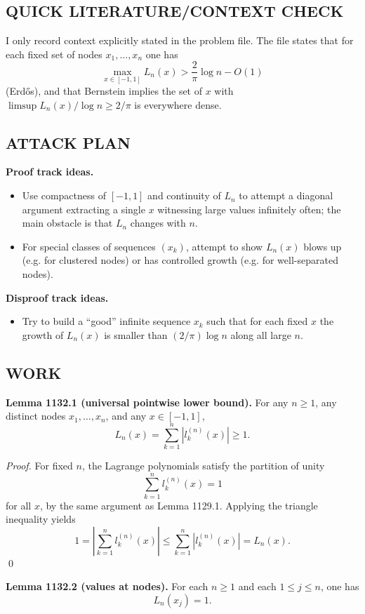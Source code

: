 \subsection*{QUICK LITERATURE/CONTEXT CHECK}
I only record context explicitly stated in the problem file.
The file states that for each fixed set of nodes $x_1,\dots,x_n$ one has
\[
\max_{x\in[-1,1]} L_n(x) > \frac{2}{\pi}\log n - O(1)
\]
(Erd\H{o}s), and that Bernstein implies the set of $x$ with $\limsup L_n(x)/\log n\ge 2/\pi$ is everywhere dense.

\subsection*{ATTACK PLAN}
\textbf{Proof track ideas.}
\begin{itemize}
\item Use compactness of $[-1,1]$ and continuity of $L_n$ to attempt a diagonal argument extracting a single $x$ witnessing large values infinitely often; the main obstacle is that $L_n$ changes with $n$.
\item For special classes of sequences $(x_k)$, attempt to show $L_n(x)$ blows up (e.g. for clustered nodes) or has controlled growth (e.g. for well-separated nodes).
\end{itemize}
\textbf{Disproof track ideas.}
\begin{itemize}
\item Try to build a ``good'' infinite sequence $x_k$ such that for each fixed $x$ the growth of $L_n(x)$ is smaller than $(2/\pi)\log n$ along all large $n$.
\end{itemize}

\subsection*{WORK}
\textbf{Lemma 1132.1 (universal pointwise lower bound).}
For any $n\ge 1$, any distinct nodes $x_1,\dots,x_n$, and any $x\in[-1,1]$,
\[
L_n(x)=\sum_{k=1}^n |l_k^{(n)}(x)|\ge 1.
\]

\emph{Proof.}
For fixed $n$, the Lagrange polynomials satisfy the partition of unity
\[
\sum_{k=1}^n l_k^{(n)}(x)=1
\]
for all $x$, by the same argument as Lemma 1129.1.
Applying the triangle inequality yields
\[
1=\left|\sum_{k=1}^n l_k^{(n)}(x)\right|\le \sum_{k=1}^n |l_k^{(n)}(x)|=L_n(x).
\]
\qed

\textbf{Lemma 1132.2 (values at nodes).}
For each $n\ge 1$ and each $1\le j\le n$, one has
\[
L_n(x_j)=1.
\]

